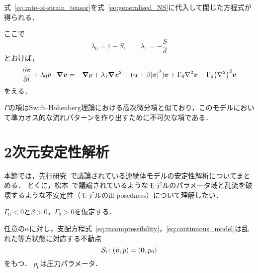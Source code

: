 \documentclass[12pt,dvipdfmx,svgnames,a4paper,uplatex]{ujarticle}
\theoremstyle{plain}
\begin{document}
式~\ref{eq:rate-of-strain_tensor}を式~\ref{eq:generalised_NS}に代入して閉じた方程式が得られる．
ここで
\begin{equation}
  \lambda_0 = 1 - S, \qquad \lambda_1 = -\frac{S}{d}
  \label{eq:def_lambda0_lambda1}
\end{equation}
とおけば，
\begin{equation}
  \pdv{\vb*{v}}{t} + \lambda_0 \vb*{v} \cdot \grad{\vb*{v}} = -\grad{p} + \lambda_1 \grad{\vb*{v}^2} - (\alpha + \beta \abs{\vb*{v}}^2) \vb*{v} + \Gamma_0 \laplacian \vb*{v} - \Gamma_2 \qty(\laplacian)^2 \vb*{v}
  \label{eq:continuous_model}
\end{equation}
をえる．

\(\Gamma\)の項はSwift--Hohenberg理論における高次微分項と似ており，このモデルにおいて準カオス的な流れパターンを作り出すために不可欠な項である．


\section{2次元安定性解析}
\label{sec:2D_stability_analysis}

本節では，先行研究~\cite{Wensink2012a, Dunkel2013a}で議論されている連続体モデルの安定性解析についてまとめる．
とくに，松本~\cite{Matsumoto2014b}で議論されているようなモデルのパラメータ域と乱流を破壊するような不安定性（モデルのill-posedness）について理解したい．

\(\Gamma_0 < 0\)と\(\beta > 0\)，\(\Gamma_2 > 0\)を仮定する．

任意の\(\alpha\)に対し，支配方程式~\ref{eq:incompressibility}，\ref{eq:continuous_model}は乱れた等方状態に対応する不動点
\begin{equation}
  \mathcal{S}_i \colon (\vb*{v}, p) = (\vb*{0}, p_0)
  \label{eq:disordered_isotropic_fixed_point}
\end{equation}
をもつ．
\(p_0\)は圧力パラメータ．
\end{document}
